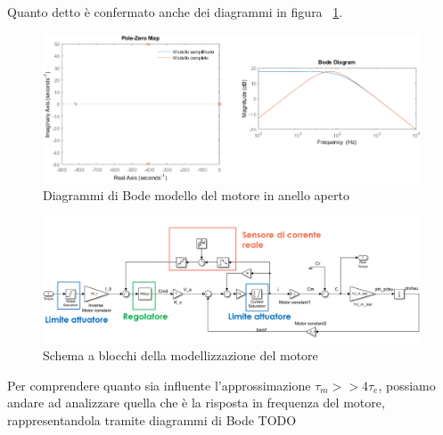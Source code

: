\begin{itemize}
	Quanto detto è confermato anche dei diagrammi in figura ~\ref{fig:motor_bode}.
	\begin{figure}[H]
		\centering   	
		\includegraphics[width=1\textwidth]{Immagini/motor_bode.png}
		\caption{Diagrammi di Bode modello del motore in anello aperto}
		\label{fig:motor_bode}
	\end{figure}
\end{itemize}

\begin{figure}[H]
	\centering   	
	\includegraphics[width=1\textwidth]{Immagini/motor_discrete_model.png}
	\caption{Schema a blocchi della modellizzazione del motore}
	\label{fig:motor}
\end{figure}

Per comprendere quanto sia influente l'approssimazione $\tau_m >> 4\tau_e$, possiamo andare ad analizzare quella che è la risposta in frequenza del motore, rappresentandola tramite diagrammi di Bode 
TODO


